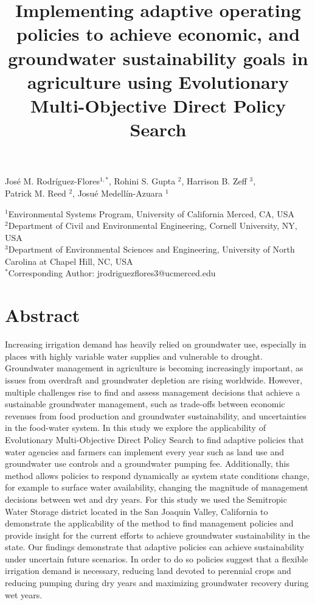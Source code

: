 \documentclass[11pt,a4paper]{article}
\title{Implementing adaptive operating policies to achieve economic, and groundwater sustainability goals in agriculture using Evolutionary Multi-Objective Direct Policy Search}
\date{}
\begin{document}
\maketitle

\vspace{-3cm}

\begin{center}
José M. Rodríguez-Flores$^{1,*}$, Rohini S. Gupta $^2$, Harrison B. Zeff $^3$,\\ Patrick M. Reed $^2$, Josué Medellín-Azuara $^1$\\
\end{center}

\begin{center}
\small
$^1$Environmental Systems Program, University of California Merced, CA, USA\\
$^2$Department of Civil and Environmental Engineering, Cornell University, NY, USA\\
$^3$Department of Environmental Sciences and Engineering, University of North Carolina at Chapel Hill, NC, USA\\
$^*$Corresponding Author: jrodriguezflores3@ucmerced.edu
\end{center}


\section*{Abstract}

Increasing irrigation demand has heavily relied on groundwater use, especially in places with highly variable water supplies and vulnerable to drought. Groundwater management in agriculture is becoming increasingly important, as issues from overdraft and groundwater depletion are rising worldwide. However, multiple challenges rise to find and assess management decisions that achieve a sustainable groundwater management, such as trade-offs between economic revenues from food production and groundwater sustainability, and uncertainties in the food-water system. In this study we explore the applicability of Evolutionary Multi-Objective Direct Policy Search to find adaptive policies that water agencies and farmers can implement every year such as land use and groundwater use controls and a groundwater pumping fee. Additionally, this method allows policies to respond dynamically as system state conditions change, for example to surface water availability, changing the magnitude of management decisions between wet and dry years. For this study we used the Semitropic Water Storage district located in the San Joaquin Valley, California to demonstrate the applicability of the method to find management policies and provide insight for the current efforts to achieve groundwater sustainability in the state. Our findings demonstrate that adaptive policies can achieve sustainability under uncertain future scenarios. In order to do so policies suggest that a flexible irrigation demand is necessary, reducing land devoted to perennial crops and reducing pumping during dry years and maximizing groundwater recovery during wet years.
 
\end{document}
